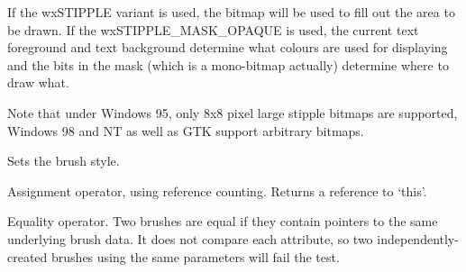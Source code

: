 If the wxSTIPPLE variant is used, the bitmap will be used to fill out the
area to be drawn. If the wxSTIPPLE\_MASK\_OPAQUE is used, the current
text foreground and text background determine what colours are used for
displaying and the bits in the mask (which is a mono-bitmap actually)
determine where to draw what.

Note that under Windows 95, only 8x8 pixel large stipple bitmaps are
supported, Windows 98 and NT as well as GTK support arbitrary bitmaps.



\label{wxbrushsetstyle}


Sets the brush style.




\label{wxbrushassignment}


Assignment operator, using reference counting. Returns a reference
to `this'.

\label{wxbrushequals}


Equality operator. Two brushes are equal if they contain pointers
to the same underlying brush data. It does not compare each attribute,
so two independently-created brushes using the same parameters will
fail the test.

